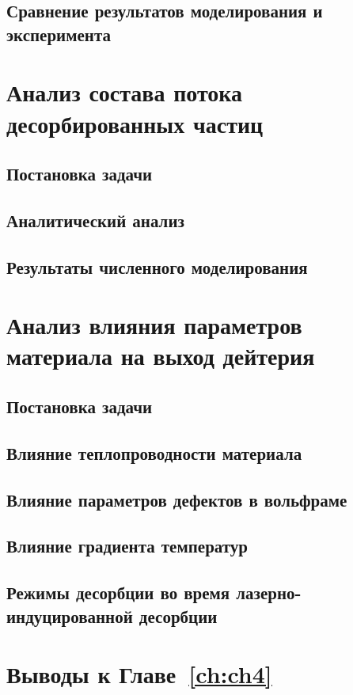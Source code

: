 \subsection{Сравнение результатов моделирования и эксперимента}\label{subsec:ch4/sec1/subsec4}

\section{Анализ состава потока десорбированных частиц}\label{sec:ch4/sec2}
\subsection{Постановка задачи}\label{subsec:ch4/seс2/subsec1}
\subsection{Аналитический анализ}\label{subsec:ch4/seс2/subsec2}
\subsection{Результаты численного моделирования}\label{subsec:ch4/seс2/subsec3}

\section{Анализ влияния параметров материала на выход дейтерия}\label{sec:ch4/seс3}
\subsection{Постановка задачи}\label{subsec:ch4/seс3/subsec1}
\subsection{Влияние теплопроводности материала}\label{subsec:ch4/seс3/subsec2}
\subsection{Влияние параметров дефектов в вольфраме}\label{subsec:ch4/seс3/subsec3}
\subsection{Влияние градиента температур}\label{subsec:ch4/seс3/subsec4}
\subsection{Режимы десорбции во время лазерно-индуцированной десорбции}\label{sec:ch4/seс4/subsec5}

\section{Выводы к Главе~\ref{ch:ch4}}

\clearpage
